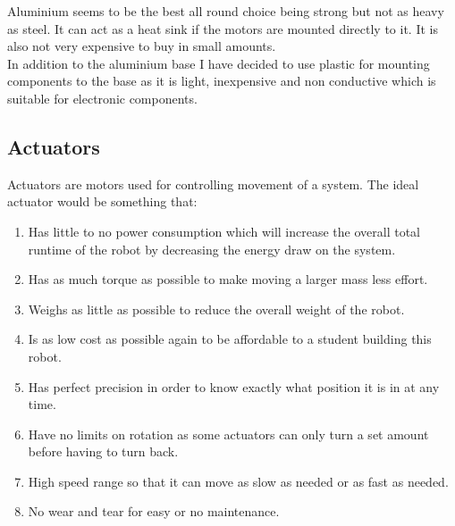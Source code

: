 Aluminium seems to be the best all round choice being strong but not as heavy as steel.  It can act as a heat sink if the motors are mounted directly to it.  It is also not very expensive to buy in small amounts.
\\In addition to the aluminium base I have decided to use plastic for mounting components to the base as it is light, inexpensive and non conductive which is suitable for electronic components.

\subsection{Actuators}
Actuators are motors used for controlling movement of a system.  The ideal actuator would be something that:
\begin{enumerate}
\item Has little to no power consumption which will increase the overall total runtime of the robot by decreasing the energy draw on the system.
\item Has as much torque as possible to make moving a larger mass less effort.
\item Weighs as little as possible to reduce the overall weight of the robot.
\item Is as low cost as possible again to be affordable to a student building this robot.
\item Has perfect precision in order to know exactly what position it is in at any time.
\item Have no limits on rotation as some actuators can only turn a set amount before having to turn back.
\item High speed range so that it can move as slow as needed or as fast as needed.
\item No wear and tear for easy or no maintenance.
\end{enumerate}
